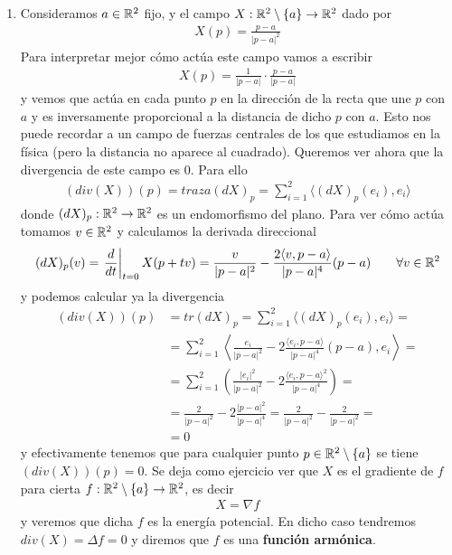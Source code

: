 \begin{observacion}
\begin{enumerate}[start=4]
        \item Consideramos $a\in \mathbb{R}^2$ fijo, y el campo $X:\mathbb{R}^2 \setminus \{a\}\to \mathbb{R}^2$ dado por 
        \begin{gather*}
            X(p)=\frac{p-a}{|p-a|^2}
        \end{gather*}
        Para interpretar mejor cómo actúa este campo vamos a escribir
        \begin{gather*}
            X(p)= \frac{1}{|p-a|} \cdot \frac{p-a}{|p-a|}
        \end{gather*}
        y vemos que actúa en cada punto $p$ en la dirección de la recta que une $p$ con $a$ y es inversamente proporcional a la distancia de dicho $p$ con $a$. Esto nos puede recordar a un campo de fuerzas centrales de los que estudiamos en la física (pero la distancia no aparece al cuadrado). Queremos ver ahora que la divergencia de este campo es $0$. Para ello
        \begin{gather*}
            (div(X))(p) = traza(dX)_p = \sum_{i=1}^2 \langle (dX)_p(e_i), e_i \rangle
        \end{gather*}
        donde $(dX)_p:\mathbb{R}^2\to \mathbb{R}^2$ es un endomorfismo del plano. Para ver cómo actúa tomamos $v\in \mathbb{R}^2$ y calculamos la derivada direccional
        \begin{gather*}
            (dX)_p(v) = \left.\frac{d}{dt}\right|_{t=0} X(p+tv) = \frac{v}{|p-a|^2} - \frac{2\langle v, p-a \rangle}{|p-a|^4}(p-a) \qquad \forall v \in \mathbb{R}^2
        \end{gather*}
        y podemos calcular ya la divergencia
        \begin{align*}
            (div(X))(p) &= tr(dX)_p = \sum_{i=1}^2 \langle (dX)_p(e_i), e_i \rangle =\\
            &= \sum_{i=1}^2 \left\langle \frac{e_i}{|p-a|^2}-2\frac{\langle e_i, p-a \rangle}{|p-a|^4}(p-a), e_i \right\rangle =\\
            &= \sum_{i=1}^2 \left(\frac{|e_i|^2}{|p-a|^2} - 2\frac{\langle e_i, p-a\rangle^2}{|p-a|^4}\right) =\\
            &= \frac{2}{|p-a|^2} - 2 \frac{|p-a|^2}{|p-a|^4} = \frac{2}{|p-a|^2} - \frac{2}{|p-a|^2} =\\
            &= 0
        \end{align*}
        y efectivamente tenemos que para cualquier punto $p\in \mathbb{R}^2 \setminus \{a\}$ se tiene $(div(X))(p)=0$. Se deja como ejercicio ver que $X$ es el gradiente de $f$ para cierta $f:\mathbb{R}^2\setminus\{a\} \to \mathbb{R}^2$, es decir
        \begin{gather*}
            X = \nabla f
        \end{gather*}
        y veremos que dicha $f$ es la energía potencial. En dicho caso tendremos $div(X)=\Delta f=0$ y diremos que $f$ es una \textbf{función armónica}.\\


\end{enumerate}
\end{observacion}
